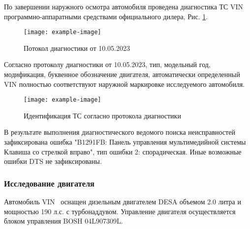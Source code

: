 {    По завершении наружного осмотра автомобиля проведена диагностика ТС VIN \vin\, программно-аппаратными средствами   официального дилера, Рис. \ref{пд}.
       \begin{figure}[H]
    	\centering
    	\texttt{[image: example-image]}
    	\caption{Потокол диагностики от 10.05.2023}
    	\label{пд}
    \end{figure}
    
      Согласно протоколу диагностики от 10.05.2023, тип, модельный год, модификация, буквенное обозначение двигателя, автоматически определенный VIN полностью соответствуют наружной маркировке исследуемого автомобиля.
   
   \begin{figure}[H]
   	\centering
   	\texttt{[image: example-image]}
   	\caption{Идентификация ТС согласно протокола диагностики}
   	\label{модельсканер}
   \end{figure}
   
   В результате выполнения диагностического ведомого поиска неисправностей  зафиксирована ошибка "B1291FB:  Панель управления мультимедийной системы Клавиша со стрелкой вправо", тип ошибки 2: спорадическая. Иные  возможные  ошибки DTS не зафиксированы. \\
   
\subsubsection{Исследование двигателя}
     
 Автомобиль  VIN \vin \, оснащен  дизельным двигателем DESA объемом 2.0 литра и мощностью 190 л.с. с турбонаддувом. Управление двигателя осуществляется блоком управления BOSH 04L907309L. 
  
}
